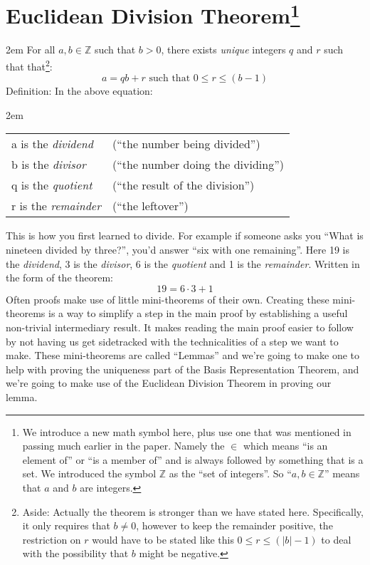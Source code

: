 \documentclass{article}
\newenvironment{jprIn}{\begin{adjustwidth}{2em}{}}{\end{adjustwidth}}
\begin{document}
\section*{Euclidean Division Theorem\footnote{We introduce a new math symbol here, plus use one that was
mentioned in passing much earlier in the paper.  Namely the $\in$ which means ``is an element of'' or
``is a member of'' and is always followed by something that is a set.  We introduced the symbol $\mathbb{Z}$ as the
``set of integers''.  So ``$a,b\in{}\mathbb{Z}$'' means that $a$ and $b$ are integers.}}
\begin{jprIn}
For all $a,b\in{}\mathbb{Z}$ such that $b>0$, there exists \emph{unique} integers $q$ and $r$ such
that
that\footnote{Aside: Actually the theorem is stronger than we have stated here. Specifically, it only requires that $b\ne0$, however
to keep the remainder positive, the restriction on $r$ would have to be stated like
this $0 \le r \le (\left|b\right|-1)$ to deal with the possibility that $b$ might be negative.}:
\[a=qb+r  \text{ such that } 0\le{}r\le{}(b-1)\]
Definition: In the above equation:
\begin{jprIn}
\begin{tabular}{l l}
a is the \emph{dividend} & (``the number being divided'')\\
b is the \emph{divisor} & (``the number doing the dividing'')\\
q is the \emph{quotient} & (``the result of the division'')\\
r is the \emph{remainder} & (``the leftover'')
\end{tabular}
\end{jprIn}
\end{jprIn}
This is how you first learned to divide.
For example if someone asks you ``What is nineteen divided by three?'', you’d
answer ``six with one remaining''. Here 19 is the \emph{dividend},  3 is the \emph{divisor},
6 is the \emph{quotient} and 1 is the \emph{remainder}. Written in the form of the theorem:
\[19=6\cdot3+1\]
Often proofs make use of little mini-theorems of their own.
Creating these mini-theorems is a way to simplify a step in
the main proof by establishing a useful non-trivial
intermediary result. It makes reading the main proof
easier to follow by not having us get sidetracked with
the technicalities of a step we want to make.
These mini-theorems are called ``Lemmas''
and we’re going to make one to help with proving the uniqueness part
of the Basis Representation Theorem, and we're going to make use of the
Euclidean Division Theorem in proving our lemma.
\end{document}
